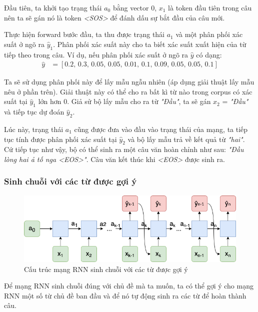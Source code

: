 Đầu tiên, ta khởi tạo trạng thái $a_0$ bằng vector 0, $x_1$ là token đầu tiên trong câu nên ta sẽ gán nó là token \textit{<SOS>} để đánh dấu sự bắt đầu của câu mới.

Thực hiện forward bước đầu, ta thu được trạng thái $a_1$ và một phân phối xác suất ở ngõ ra $\hat{y}_1$. Phân phối xác suất này cho ta biết xác suất xuất hiện của từ tiếp theo trong câu. Ví dụ, nếu phân phối xác suất ở ngõ ra $\hat{y}$ có dạng:
\begin{align*}
  \hat{y} &= [0.2, \, 0.3, \, 0.05, \, 0.05, \, 0.01, \, 0.1, \, 0.09, \, 0.05, \, 0.05, \, 0.1]
\end{align*}

Ta sẽ sử dụng phân phối này để lấy mẫu ngẫu nhiên (áp dụng giải thuật lấy mẫu nêu ở phần trên). Giải thuật này có thể cho ra bất kì từ nào trong corpus có xác suất tại $\hat{y}_1$ lớn hơn 0. Giả sử bộ lấy mẫu cho ra từ \textit{"Đầu"}, ta sẽ gán $x_2$ = \textit{"Đầu"} \, và tiếp tục dự đoán $\hat{y}_2$.

Lúc này, trạng thái $a_1$ cũng được đưa vào đầu vào trạng thái của mạng, ta tiếp tục tính được phân phối xác suất tại $\hat{y}_2$ và bộ lấy mẫu trả về kết quả từ \textit{"hai"}. Cứ tiếp tục như vậy, bộ có thể sinh ra một câu văn hoàn chỉnh như sau: \textit{"Đầu lòng hai ả tố nga <EOS>"}. Câu văn kết thúc khi \textit{<EOS>} được sinh ra.

\subsubsection{Sinh chuỗi với các từ được gợi ý}

\begin{figure}[h!]
	\centering
		\includegraphics[width=1\columnwidth]{chapter07/figure-sec3/rnn_network2.png}
		\centering
	\caption{Cấu trúc mạng RNN sinh chuỗi với các từ được gợi ý}
\end{figure}

Để mạng RNN sinh chuỗi đúng với chủ đề mà ta muốn, ta có thể gợi ý cho mạng RNN một số từ chủ đề ban đầu và để nó tự động sinh ra các từ để hoàn thành câu.

